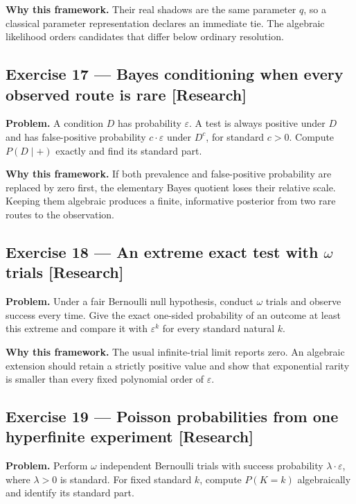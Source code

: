 \documentclass[11pt]{article}
\newcommand{\eps}{\varepsilon}
\begin{document}
\textbf{Why this framework.} Their real shadows are the same parameter $q$, so a
classical parameter representation declares an immediate tie. The algebraic
likelihood orders candidates that differ below ordinary resolution.


\subsection*{Exercise 17 --- Bayes conditioning when every observed route is rare \hfill \normalfont\small[Research]}

\textbf{Problem.} A condition $D$ has probability $\eps$. A test is always
positive under $D$ and has false-positive probability $c\cdot \eps$ under
$D^c$, for standard $c>0$. Compute $P(D\mid +)$ exactly and find its
standard part.

\textbf{Why this framework.} If both prevalence and false-positive probability are
replaced by zero first, the elementary Bayes quotient loses their relative
scale. Keeping them algebraic produces a finite, informative posterior from
two rare routes to the observation.


\subsection*{Exercise 18 --- An extreme exact test with $\omega$ trials \hfill \normalfont\small[Research]}

\textbf{Problem.} Under a fair Bernoulli null hypothesis, conduct $\omega$ trials
and observe success every time. Give the exact one-sided probability of an
outcome at least this extreme and compare it with $\eps^k$ for every
standard natural $k$.

\textbf{Why this framework.} The usual infinite-trial limit reports zero. An
algebraic extension should retain a strictly positive value and show that
exponential rarity is smaller than every fixed polynomial order of
$\eps$.


\subsection*{Exercise 19 --- Poisson probabilities from one hyperfinite experiment \hfill \normalfont\small[Research]}

\textbf{Problem.} Perform $\omega$ independent Bernoulli trials with success
probability $\lambda\cdot \eps$, where $\lambda>0$ is standard. For fixed standard
$k$, compute $P(K=k)$ algebraically and identify its standard part.
\end{document}
